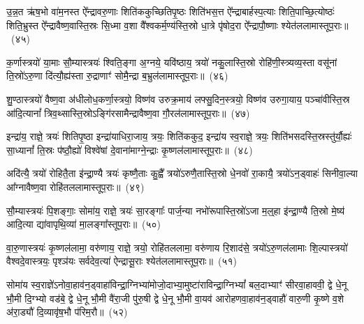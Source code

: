 {\anuvakamend[{}]}%

उ॒न्न॒त ऋ॑ष॒भो वा॑म॒नस्त ऐ᳚न्द्रावरु॒णाः शिति॑ककुच्छितिपृ॒ष्ठः शिति॑भस॒त्त ऐ᳚न्द्राबार्\mbox{}हस्प॒त्याः शिति॒पाच्छि॒त्योष्ठः॑ शिति॒भ्रुस्त ऐ᳚न्द्रावैष्ण॒वास्ति॒स्रः सि॒ध्मा व॒शा वै᳚श्वकर्म॒ण्य॑स्ति॒स्रो धा॒त्रे पृ॑षोद॒रा ऐ᳚न्द्रापौ॒ष्णाः श्येत॑ललामास्तूप॒राः॥~(४५)\ip

{}%

क॒र्णास्त्रयो॑ या॒माः सौ॒म्यास्त्रयः॑ श्विति॒ङ्गा अ॒ग्नये॒ यवि॑ष्ठाय॒ त्रयो॑ नकु॒लास्ति॒स्रो रोहि॑\-णी॒\-स्त्र्यव्य॒स्ता वसू॑नां ति॒स्रो॑\-ऽरु॒णा दि॑त्यौ॒ह्य॑स्ता रु॒द्राणाꣳ॑ सोमै॒न्द्रा ब॒भ्रुल॑लामास्तूप॒राः॥~(४६)\ip

{\anuvakamend[{क॒र्णास्त्रयो॑विꣳशतिः}]}%

शु॒ण्ठास्त्रयो॑ वैष्ण॒वा अ॑धीलोध॒कर्णा॒स्त्रयो॒ विष्ण॑व उरुक्र॒माय॑ लफ्सु॒दिन॒स्त्रयो॒ विष्ण॑व उरुगा॒याय॒ पञ्चा॑वीस्ति॒स्र आ॑दि॒त्यानां᳚ त्रिव॒थ्सास्ति॒स्रो\-ऽङ्गि॑रसामैन्द्रावैष्ण॒वा गौ॒रल॑लामास्तूप॒राः॥~(४७)\ip

{\anuvakamend[{शु॒ण्ठा विꣳ॑श॒तिः}]}%

इन्द्रा॑य॒ राज्ञे॒ त्रयः॑ शितिपृ॒ष्ठा इन्द्रा॑याधिरा॒जाय॒ त्रयः॒ शिति॑ककुद॒ इन्द्रा॑य स्व॒राज्ञे॒ त्रयः॒ शिति॑भसदस्ति॒स्रस्तु॑र्यौ॒ह्यः॑ सा॒ध्यानां᳚ ति॒स्रः प॑ष्ठौ॒ह्यो॑ विश्वे॑षां दे॒वाना॑माग्ने॒न्द्राः कृ॒ष्णल॑लामास्तूप॒राः॥~(४८)\ip

{\anuvakamend[{इन्द्रा॑य॒ राज्ञे॒ द्वाविꣳ॑शतिः}]}%

अदि॑त्यै॒ त्रयो॑ रोहितै॒ता इ॑न्द्रा॒ण्यै त्रयः॑ कृष्णै॒ताः कु॒ह्वै᳚ त्रयो॑\-ऽरुणै॒तास्ति॒स्रो धे॒नवो॑ रा॒कायै॒ त्रयो॑\-ऽन॒ड्वाहः॑ सिनीवा॒ल्या आ᳚ग्नावैष्ण॒वा रोहि॑तललामास्तूप॒राः॥~(४९)\ip

{\anuvakamend[{अदि॑त्या अ॒ष्टाद॑श}]}%

सौ॒म्यास्त्रयः॑ पि॒शङ्गाः॒ सोमा॑य॒ राज्ञे॒ त्रयः॑ सा॒रङ्गाः᳚ पार्ज॒न्या नभो॑रूपास्ति॒स्रो॑\-ऽजा म॒ल्॒\mbox{}हा इ॑न्द्रा॒ण्यै ति॒स्रो मे॒ष्य॑ आदि॒त्या द्या॑वापृथि॒व्या॑ मा॒लङ्गा᳚स्तूप॒राः॥~(५०)\ip

{\anuvakamend[{सौ॒म्या एका॒न्नविꣳ॑शतिः}]}%

वा॒रु॒णास्त्रयः॑ कृ॒ष्णल॑लामा॒ वरु॑णाय॒ राज्ञे॒ त्रयो॒ रोहि॑तललामा॒ वरु॑णाय रि॒शाद॑से॒ त्रयो॑\-ऽरु॒णल॑लामाः शि॒ल्पास्त्रयो॑ वैश्वदे॒वास्त्रयः॒ पृश्ञ॑यः सर्वदेव॒त्या॑ ऐन्द्रासू॒राः श्येत॑ललामास्तूप॒राः॥~(५१)\ip

{\anuvakamend[{वा॒रु॒णा विꣳ॑श॒तिः}]}%

सोमा॑य स्व॒राज्ञे॑\-ऽनोवा॒हाव॑न॒ड्वाहा॑विन्द्रा॒ग्निभ्या॑मोजो॒दाभ्या॒मुष्टा॑राविन्द्रा॒ग्नि\-भ्यां᳚ बल॒\-दाभ्याꣳ॑ सीरवा॒हाववी॒ द्वे धे॒नू भौ॒मी दि॒ग्भ्यो वड॑बे॒ द्वे धे॒नू भौ॒मी वै॑रा॒जी पु॑रु॒षी द्वे धे॒नू भौ॒मी वा॒यव॑ आरोहणवा॒हाव॑न॒ड्वाहौ॑ वारु॒णी कृ॒ष्णे व॒शे अ॑रा॒ड्यौ॑ दि॒व्यावृ॑ष॒भौ प॑रिम॒रौ॥~(५२)\ip

